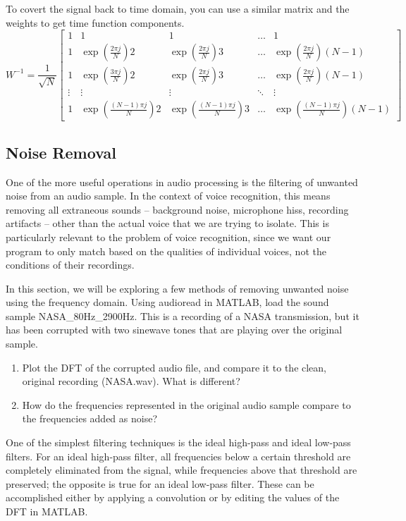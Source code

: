 \documentclass{tufte-handout}
\begin{document}
To covert the signal back to time domain, you can use a similar matrix and the weights to get time function components. 
\begin{equation}\label{eq:basis_fns}
    W^{-1}=\dfrac{1}{\sqrt{N}}
\begin{bmatrix}
    1 & 1 & 1 & \dots  & 1 \\
    1 & \exp(\frac{2 \pi j}{N})2 & \exp(\frac{2 \pi j}{N})3 & \dots  & \exp(\frac{2 \pi j}{N})(N-1) \\
    1 & \exp(\frac{3 \pi j}{N})2 & \exp(\frac{2 \pi j}{N})3 & \dots  & \exp(\frac{2 \pi j}{N}) (N-1) \\
    \vdots & \vdots & \vdots & \ddots & \vdots \\
    1 & \exp(\frac{(N-1) \pi j}{N})2 & \exp(\frac{(N-1) \pi j}{N})3 & \dots  & \exp(\frac{(N-1) \pi j}{N}) (N-1)
\end{bmatrix}
\end{equation}

\subsection{Noise Removal}
One of the more useful operations in audio processing is the filtering of unwanted noise from an audio sample. In the context of voice recognition, this means removing all extraneous sounds – background noise, microphone hiss, recording artifacts – other than the actual voice that we are trying to isolate. This is particularly relevant to the problem of voice recognition, since we want our program to only match based on the qualities of individual voices, not the conditions of their recordings.

In this section, we will be exploring a few methods of removing unwanted noise using the frequency domain. Using audioread in MATLAB, load the sound sample NASA_80Hz_2900Hz. This is a recording of a NASA transmission, but it has been corrupted with two sinewave tones that are playing over the original sample.

\begin{enumerate}
	\item Plot the DFT of the corrupted audio file, and compare it to the clean, original recording (NASA.wav). What is different?
	\item How do the frequencies represented in the original audio sample compare to the frequencies added as noise?
\end{enumerate}

One of the simplest filtering techniques is the ideal high-pass and ideal low-pass filters. For an ideal high-pass filter, all frequencies below a certain threshold are completely eliminated from the signal, while frequencies above that threshold are preserved; the opposite is true for an ideal low-pass filter. These can be accomplished either by applying a convolution or by editing the values of the DFT in MATLAB.
\end{document}
